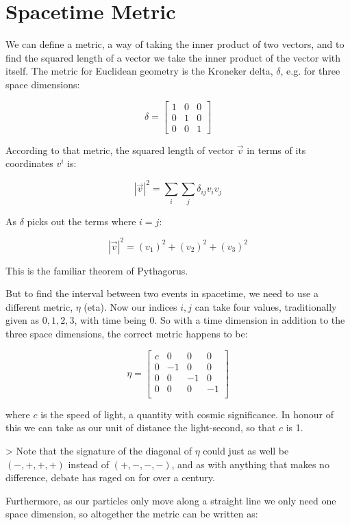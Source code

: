 \section{Spacetime Metric}

We can define a metric, a way of taking the inner product of two vectors, and to find the squared length of a vector we take the inner product of the vector with itself. The metric for Euclidean geometry is the Kroneker delta, $\delta$, e.g. for three space dimensions:

$$
\delta =
\begin{bmatrix}
1 & 0 & 0 \\
0 & 1 & 0 \\
0 & 0 & 1
\end{bmatrix}
$$

According to that metric, the squared length of vector $\vec{v}$ in terms of its coordinates $v^i$ is:

$$|\vec{v}|^2 = \sum_i \sum_j \delta_{ij}v_iv_j$$

As $\delta$ picks out the terms where $i = j$:

$$|\vec{v}|^2 = (v_1)^2 + (v_2)^2 + (v_3)^2$$

This is the familiar theorem of Pythagorus.

But to find the interval between two events in spacetime, we need to use a different metric, $\eta$ (eta). Now our indices $i, j$ can take four values, traditionally given as $0, 1, 2, 3$, with time being $0$. So with a time dimension in addition to the three space dimensions, the correct metric happens to be:

$$
\eta =
\begin{bmatrix}
c & 0 & 0 & 0 \\
0 & -1 & 0 & 0 \\
0 & 0 & -1 & 0 \\
0 & 0 & 0 & -1 \\
\end{bmatrix}
$$

where $c$ is the speed of light, a quantity with cosmic significance. In honour of this we can take as our unit of distance the light-second, so that $c$ is 1.

> Note that the signature of the diagonal of $\eta$ could just as well be $(-, +, +, +)$ instead of $(+, -, -, -)$, and as with anything that makes no difference, debate has raged on for over a century.

Furthermore, as our particles only move along a straight line we only need one space dimension, so altogether the metric can be written as:

